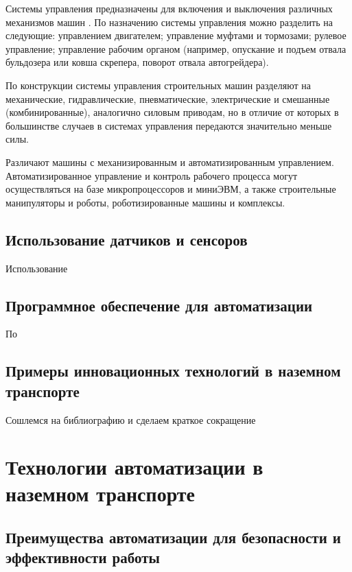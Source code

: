 Системы управления предназначены для включения и выключения различных механизмов машин \cite[с.~109]{Evtukov}.
По назначению системы управления можно разделить на следующие: управлением двигателем; управление муфтами и тормозами; рулевое управление; управление рабочим органом (например, опускание и подъем отвала бульдозера или ковша скрепера, поворот отвала автогрейдера).

По конструкции системы управления строительных машин разделяют на механические, гидравлические, пневматические, электрические и смешанные (комбинированные), аналогично силовым приводам, но в отличие от которых в большинстве случаев в системах управления передаются значительно меньше силы.

Различают машины с механизированным и автоматизированным управлением. Автоматизированное управление и контроль рабочего процесса могут осуществляться на базе микропроцессоров и миниЭВМ, а также строительные манипуляторы и роботы, роботизированные машины и комплексы.

\subsection{Использование датчиков и сенсоров}\label{subsec:ch1/sec2/sub2}

Использование

\subsection{Программное обеспечение для автоматизации}\label{subsec:ch1/sec2/sub3}

По

\subsection{Примеры инновационных технологий в наземном транспорте}\label{subsec:ch1/sec2/sub4}

Сошлемся на библиографию и сделаем краткое сокращение 

\section{Технологии автоматизации в наземном транспорте}\label{sec:ch1/sec3}

\subsection{Преимущества автоматизации для безопасности и эффективности работы}\label{subsec:ch1/sec3/sub1}

